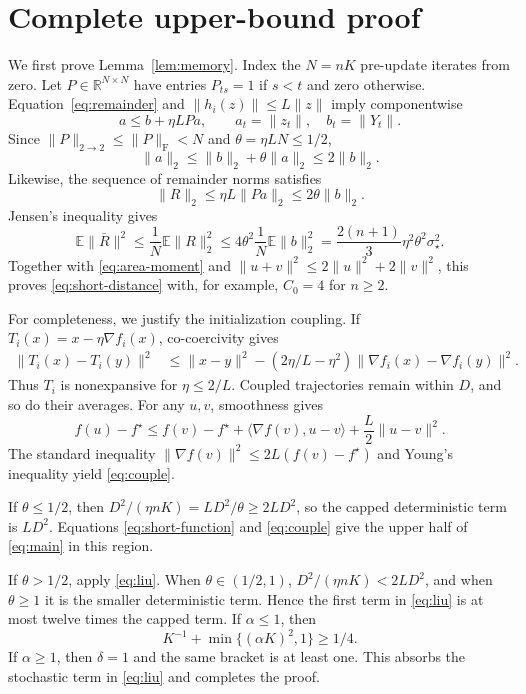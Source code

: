 \documentclass{article}
\theoremstyle{remark}
\newcommand{\E}{\mathbb E}
\newcommand{\R}{\mathbb R}
\newcommand{\1}{\mathbf 1}
\begin{document}
\section{Complete upper-bound proof}\label{app:upper}

We first prove Lemma~\ref{lem:memory}. Index the $N=nK$ pre-update iterates from zero. Let $P\in\R^{N\times N}$ have entries $P_{ts}=1$ if $s<t$ and zero otherwise. Equation~\eqref{eq:remainder} and $\|h_i(z)\|\leq L\|z\|$ imply componentwise \[ a\leq b+\eta LPa, \qquad a_t=\|z_t\|, \quad b_t=\|Y_t\|. \] Since $\|P\|_{2\to2}\leq\|P\|_{\mathrm F}<N$ and $\theta=\eta LN\leq1/2$,
\begin{equation}
 \|a\|_2\leq\|b\|_2+\theta\|a\|_2
 \leq2\|b\|_2.                                      \label{eq:a-b}
\end{equation}
Likewise, the sequence of remainder norms satisfies
\begin{equation}
 \|R\|_2\leq\eta L\|Pa\|_2
 \leq2\theta\|b\|_2.                                \label{eq:R-b}
\end{equation}
Jensen's inequality gives \[ \E\|\bar R\|^2 \leq\frac1N\E\|R\|_2^2 \leq4\theta^2\frac1N\E\|b\|_2^2 =\frac{2(n+1)}{3}\eta^2\theta^2\sigma_\star^2. \] Together with \eqref{eq:area-moment} and $\|u+v\|^2\leq2\|u\|^2+2\|v\|^2$, this proves \eqref{eq:short-distance} with, for example, $C_0=4$ for $n\geq2$.

For completeness, we justify the initialization coupling. If $T_i(x)= x-\eta\nabla f_i(x)$, co-coercivity gives
\begin{align*}
 \|T_i(x)-T_i(y)\|^2
 &\leq\|x-y\|^2
 -(2\eta/L-\eta^2)
   \|\nabla f_i(x)-\nabla f_i(y)\|^2.
\end{align*}
Thus $T_i$ is nonexpansive for $\eta\leq2/L$. Coupled trajectories remain within $D$, and so do their averages. For any $u,v$, smoothness gives \[ f(u)-f^\star \leq f(v)-f^\star+\langle\nabla f(v),u-v\rangle +\frac L2\|u-v\|^2. \] The standard inequality $\|\nabla f(v)\|^2\leq2L(f(v)-f^\star)$ and Young's inequality yield \eqref{eq:couple}.

If $\theta\leq1/2$, then $D^2/(\eta nK)=LD^2/\theta\geq2LD^2$, so the capped deterministic term is $LD^2$. Equations \eqref{eq:short-function} and \eqref{eq:couple} give the upper half of \eqref{eq:main} in this region.

If $\theta>1/2$, apply \eqref{eq:liu}. When $\theta\in(1/2,1)$, $D^2/(\eta nK)<2LD^2$, and when $\theta\geq1$ it is the smaller deterministic term. Hence the first term in \eqref{eq:liu} is at most twelve times the capped term. If $\alpha\leq1$, then \[ K^{-1}+\min\{(\alpha K)^2,1\}\geq1/4. \] If $\alpha\geq1$, then $\delta=1$ and the same bracket is at least one. This absorbs the stochastic term in \eqref{eq:liu} and completes the proof.
\end{document}
